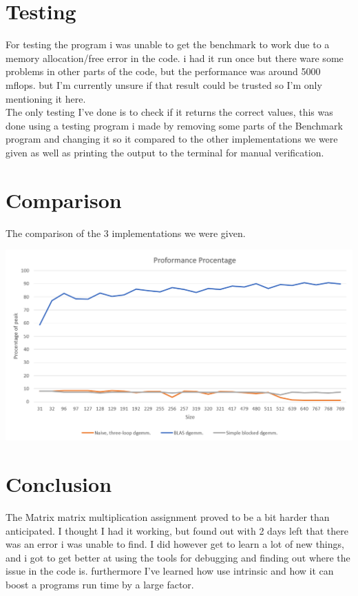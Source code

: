 \documentclass[a4paper,10pt,titlepage]{report}
\begin{document}
\section{Testing}
For testing the program i was unable to get the benchmark to work due to a memory allocation/free error in the code. i had it run once but there ware some problems 
in other parts of the code, but the performance was around 5000 mflops. but I'm currently unsure if that result could be trusted so I'm only mentioning it here.\\

The only testing I've done is to check if it returns the correct values, this was done using a testing program i made by removing some parts of the Benchmark program and changing it so it compared to the other implementations we were given as well as printing the output to the terminal for manual verification.

\section{Comparison}
The comparison of the 3 implementations we were given.


\includegraphics[scale=0.3]{Procentage}

\section{Conclusion}
The Matrix matrix multiplication assignment proved to be a bit harder than anticipated. I thought I had it working, but found out with 2 days left that there was an error i was unable to find. I did however get to learn a lot of new things, and i got to get better at using the tools for debugging and finding out where the issue in the code is. furthermore I've learned how use intrinsic and how it can boost a programs run time by a large factor.
\end{document}
